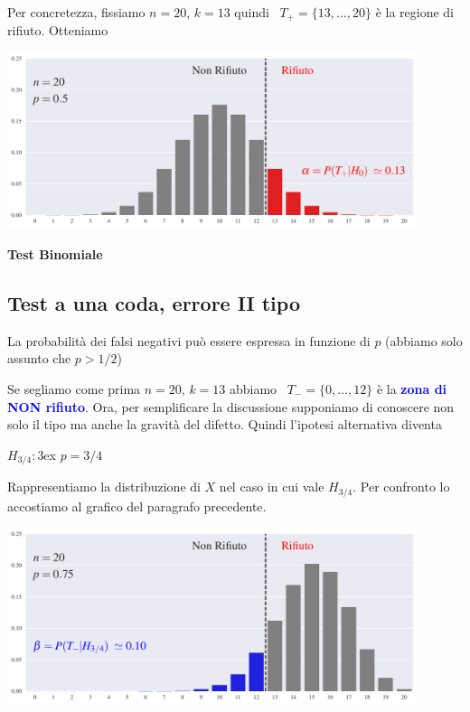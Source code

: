 \documentclass[12pt,openany]{book}
\def\emph#1{\textcolor{blue}{\textbf{\boldmath #1}}}
\theoremstyle{mio}
\theoremstyle{liscio}
\begin{document}
Per concretezza, fissiamo $n=20$, $k=13$ quindi {\color{red}\boldmath\ $T_+=\{13,\dots,20\}$} è la regione di rifiuto. Otteniamo %


\hfil\includegraphics[width=0.9\textwidth]{figure/B-test_01.pdf}


\hfill{}\clearpage\hfill\textbf{Test Binomiale}\subsection{Test a una coda, errore II tipo}

La probabilità dei falsi negativi può essere espressa in funzione di $p$ (abbiamo solo assunto che $p>1/2$)



Se segliamo come prima $n=20$, $k=13$ abbiamo {\color{blue}\boldmath\ $T_-=\{0,\dots,12\}$} è la \emph{zona di NON rifiuto}.
Ora, per semplificare la discussione supponiamo di conoscere non solo il tipo ma anche la gravità del difetto. Quindi l'ipotesi alternativa diventa

$H_{3/4}:$\kern3ex $p=3/4$

Rappresentiamo la distribuzione di $X$ nel caso in cui vale $H_{3/4}$. Per confronto lo accostiamo al grafico del paragrafo precedente. 


\hfil\includegraphics[width=0.9\textwidth]{figure/B-test_02.pdf}
\end{document}
